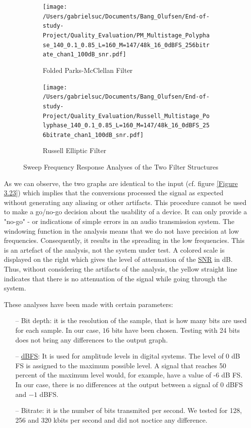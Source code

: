 \begin{figure}[ht]
	\begin{subfigure}[b]{0.5\textwidth}
		\texttt{[image: /Users/gabrielsuc/Documents/Bang\_Olufsen/End-of-study-Project/Quality\_Evaluation/PM\_Multistage\_Polyphase\_140\_0.1\_0.85\_L=160\_M=147/48k\_16\_0dBFS\_256bitrate\_chan1\_100dB\_snr.pdf]}
		\caption{Folded Parks-McClellan Filter}
		
	\end{subfigure}
	\hfill
	\begin{subfigure}[b]{0.5\textwidth}
		\texttt{[image: /Users/gabrielsuc/Documents/Bang\_Olufsen/End-of-study-Project/Quality\_Evaluation/Russell\_Multistage\_Polyphase\_140\_0.1\_0.85\_L=160\_M=147/48k\_16\_0dBFS\_256bitrate\_chan1\_100dB\_snr.pdf]}
		\caption{Russell Elliptic Filter}
		
	\end{subfigure}
	\captionsetup{width=0.95\linewidth}
	\caption{Sweep Frequency Response Analyses of the Two Filter Structures}\label{Figure 3.24}
\end{figure}

As we can observe, the two graphs are identical to the input (cf. figure \ref{Figure 3.23}) which implies that the conversions processed the signal as expected without generating any aliasing or other artifacts. This procedure cannot be used to make a go/no-go
 decision about the usability of a device. It can only provide a "no-go" - or indications of simple errors in an audio transmission system. The windowing function in the analysis means that we do not have precision at low frequencies. Consequently, it results in the spreading in the low frequencies. This is an artefact of the analysis, not the system under test. A colored scale is displayed on the right which gives the level of attenuation of the \hyperlink{SNR}{SNR} in \si{dB}. Thus, without considering the artifacts of the analysis, the yellow straight line indicates that there is no attenuation of the signal while going through the system. 
 


These analyses have been made with certain parameters:
\begin{itemize}
	\item[--] Bit depth: it is the resolution of the sample, that is how many bits are used for each sample. In our case, $16$ bits have been chosen. Testing with 24 bits does not bring any differences to the output graph.
	\item[--] \hyperlink{dB FS}{dBFS}: It is used for amplitude levels in digital systems. The level of 0 dB FS is assigned to the maximum possible level. A signal that reaches 50 percent of the maximum level would, for example, have a value of -6 dB FS. In our case, there is no differences at the output between a signal of 0 dBFS and $-1$ dBFS.
	\item[--] Bitrate: it is the number of bits transmited per second. We tested for 128, 256 and 320 kbits per second and did not noctice any difference. 
\end{itemize}

